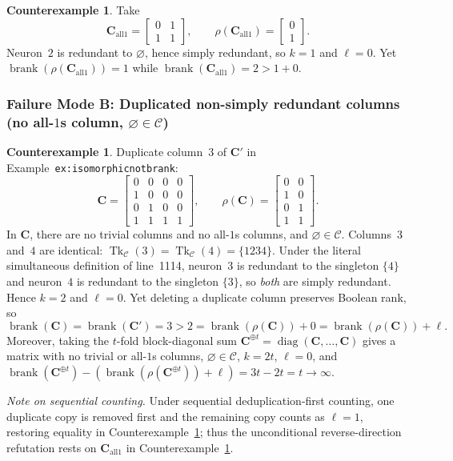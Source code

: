 \documentclass[11pt]{article}
\theoremstyle{plain}
\theoremstyle{definition}
\newtheorem{counterexample}[theorem]{Counterexample}
\theoremstyle{remark}
\DeclareMathOperator{\brank}{brank}
\DeclareMathOperator{\Tk}{Tk}
\DeclareMathOperator{\diag}{diag}
\begin{document}
\begin{counterexample}\label{cex:all1}
Take
\[
\mathbf{C}_{\mathrm{all1}} = \begin{bmatrix} 0 & 1 \\ 1 & 1 \end{bmatrix}, \qquad \rho(\mathbf{C}_{\mathrm{all1}}) = \begin{bmatrix} 0 \\ 1 \end{bmatrix}.
\]
Neuron~$2$ is redundant to $\varnothing$, hence simply redundant, so $k = 1$ and $\ell = 0$. Yet $\brank(\rho(\mathbf{C}_{\mathrm{all1}})) = 1$ while $\brank(\mathbf{C}_{\mathrm{all1}}) = 2 > 1 + 0$.
\end{counterexample}

\subsubsection*{Failure Mode B: Duplicated non-simply redundant columns (no all-$1$s column, $\varnothing \in \mathcal{C}$)}

\begin{counterexample}\label{cex:dup}
Duplicate column~$3$ of $\mathbf{C}'$ in Example~\texttt{ex:isomorphicnotbrank}:
\[
\mathbf{C} = \begin{bmatrix} 0 & 0 & 0 & 0 \\ 1 & 0 & 0 & 0 \\ 0 & 1 & 0 & 0 \\ 1 & 1 & 1 & 1 \end{bmatrix}, \qquad \rho(\mathbf{C}) = \begin{bmatrix} 0 & 0 \\ 1 & 0 \\ 0 & 1 \\ 1 & 1 \end{bmatrix}.
\]
In $\mathbf{C}$, there are no trivial columns and no all-$1$s columns, and $\varnothing \in \mathcal{C}$. Columns~$3$ and~$4$ are identical: $\Tk_{\mathcal{C}}(3) = \Tk_{\mathcal{C}}(4) = \{1234\}$. Under the literal simultaneous definition of line~1114, neuron~$3$ is redundant to the singleton $\{4\}$ and neuron~$4$ is redundant to the singleton $\{3\}$, so \emph{both} are simply redundant. Hence $k = 2$ and $\ell = 0$. Yet deleting a duplicate column preserves Boolean rank, so
\[
\brank(\mathbf{C}) = \brank(\mathbf{C}') = 3 > 2 = \brank(\rho(\mathbf{C})) + 0 = \brank(\rho(\mathbf{C})) + \ell.
\]
Moreover, taking the $t$-fold block-diagonal sum $\mathbf{C}^{\oplus t} = \diag(\mathbf{C}, \dots, \mathbf{C})$ gives a matrix with no trivial or all-$1$s columns, $\varnothing \in \mathcal{C}$, $k = 2t$, $\ell = 0$, and $\brank(\mathbf{C}^{\oplus t}) - (\brank(\rho(\mathbf{C}^{\oplus t})) + \ell) = 3t - 2t = t \to \infty$.

\emph{Note on sequential counting.} Under sequential deduplication-first counting, one duplicate copy is removed first and the remaining copy counts as $\ell = 1$, restoring equality in Counterexample~\ref{cex:dup}; thus the unconditional reverse-direction refutation rests on $\mathbf{C}_{\mathrm{all1}}$ in Counterexample~\ref{cex:all1}.
\end{counterexample}
\end{document}
